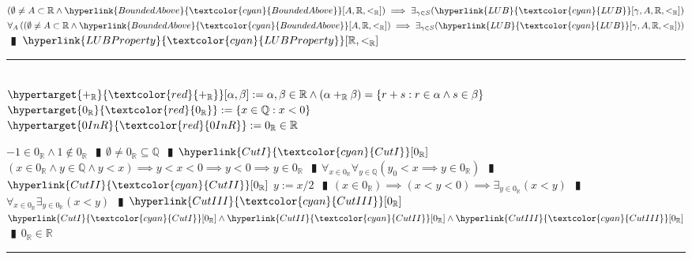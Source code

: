 \documentclass{book}
\newcommand{\df}[1]{\hypertarget{#1}{\textcolor{red}{#1}}}
\newcommand{\rf}[1]{\hyperlink{#1}{\textcolor{cyan}{#1}}}
\newcommand{\abr}{:=}
\newcommand{\pipe}{$\phantom{(}\vrectangleblack\phantom{)}$}
\newcommand{\pr}[1]{\left(#1\right)}
\begin{document}
\begin{enumerate}
\begin{enumerate}
  \end{enumerate}  
  \lit $(\emptyset \neq A \subset \mathbb{R} \land \rf{BoundedAbove}[A, \mathbb{R}, <_{\mathbb{R}}]) \implies \exists_{\gamma \in S}(\rf{LUB}[\gamma, A, \mathbb{R}, <_{\mathbb{R}}])$
  \lit $\forall_{A}\pr{(\emptyset \neq A \subset \mathbb{R} \land \rf{BoundedAbove}[A, \mathbb{R}, <_{\mathbb{R}}]) \implies \exists_{\gamma \in S}(\rf{LUB}[\gamma, A, \mathbb{R}, <_{\mathbb{R}}])}$ \pipe $\rf{LUBProperty}[\mathbb{R}, <_{\mathbb{R}}]$
\end{enumerate} \vspace{.75mm} \hrule \vspace{.75mm} \ \\

$\df{+_{\mathbb{R}}}[\alpha, \beta] \abr \alpha, \beta \in \mathbb{R} \land (\alpha +_{\mathbb{R}} \beta) = \{r + s : r \in \alpha \land s \in \beta\}$ \\
$\df{0_{\mathbb{R}}} \abr \{x \in \mathbb{Q} : x < 0\}$ \\

$\df{0InR} \abr 0_{\mathbb{R}} \in \mathbb{R}$
\begin{enumerate}
  \lit $-1 \in 0_{\mathbb{R}} \land 1 \notin 0_{\mathbb{R}}$ \pipe $\emptyset \neq 0_{\mathbb{R}} \subseteq \mathbb{Q}$ \pipe $\rf{CutI}[0_{\mathbb{R}}]$
  \lit $(x \in 0_{\mathbb{R}} \land y \in \mathbb{Q} \land y < x) \implies y < x < 0 \implies y < 0 \implies y \in 0_{\mathbb{R}}$ \pipe $\forall_{x \in 0_{\mathbb{R}}} \forall_{y \in \mathbb{Q}} (y_0 < x \implies y \in 0_{\mathbb{R}})$ \pipe $\rf{CutII}[0_{\mathbb{R}}]$
  \lit $y \abr x / 2$ \pipe $(x \in 0_{\mathbb{R}}) \implies (x < y < 0) \implies \exists_{y \in 0_{\mathbb{R}}}(x < y)$ \pipe $\forall_{x \in 0_{\mathbb{R}}} \exists_{y \in 0_{\mathbb{R}}}(x < y)$ \pipe $\rf{CutIII}[0_{\mathbb{R}}]$
  \lit $\rf{CutI}[0_{\mathbb{R}}] \land \rf{CutII}[0_{\mathbb{R}}] \land \rf{CutIII}[0_{\mathbb{R}}]$ \pipe $0_{\mathbb{R}} \in \mathbb{R}$
\end{enumerate} \vspace{.75mm} \hrule \vspace{.75mm} \ \\
\end{document}
